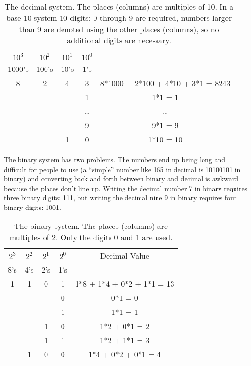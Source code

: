 \begin{table}
\centering
\begin{tabular}{c | c | c | c || c  }
$10^{3}$ & $10^{2}$ &$10^1$&$10^0$&\\
 1000's &  100's & 10's & 1's & \\
\hline
8 &   2 & 4 & 3 & 8*1000 + 2*100 + 4*10 + 3*1 = 8243 \\
&& & 1 & 1*1 = 1\\
&& & \ldots & \ldots\\
&& & 9 & 9*1 = 9 \\
&& 1 & 0 & 1*10 = 10\\
\end{tabular}
\caption{The decimal system.  The places (columns) are multiples of 10.  In a base 10 system 10 digits: 0 through 9 are required, numbers larger than 9 are denoted using the other places (columns), so no additional digits are necessary.}\label{tab:decimal}
\end{table}

The binary system has two problems.  The numbers end up being long and difficult for people to use (a ``simple'' number like 165 in decimal is 10100101 in binary) and converting back and forth between binary and decimal is awkward because the places don't line up.  Writing the decimal number 7 in binary requires three binary digits: 111, but writing the decimal nine 9 in binary requires four binary digits: 1001.

\begin{table}
\centering
\begin{tabular}{ c|c | c | c || c  }
$2^{3}$ & $2^{2}$ &$2^1$&$2^0$& Decimal Value\\
 8's &  4's & 2's & 1's & \\
\hline
 1 &  1 & 0 & 1 & 1*8 + 1*4 + 0*2 + 1*1 = 13 \\
&& & 0 & 0*1 = 0\\
&& & 1 & 1*1 = 1 \\
&& 1& 0 & 1*2 + 0*1 = 2 \\
&& 1 & 1 & 1*2 + 1*1 = 3\\
& 1 & 0 & 0 & 1*4 + 0*2 + 0*1 = 4\\
\end{tabular}
\caption{The binary system.  The places (columns) are multiples of 2.  Only the digits 0 and 1 are used.}\label{tab:binary}
\end{table}

